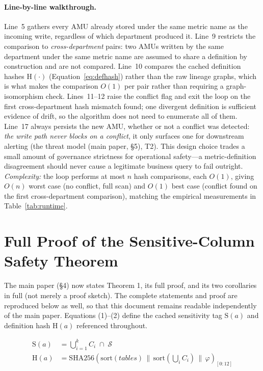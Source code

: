\documentclass[9pt,twocolumn,twoside]{extarticle}
\begin{document}
\paragraph{Line-by-line walkthrough.}
Line~5 gathers every AMU already stored under the same metric name as the
incoming write, regardless of which department produced it.
Line~9 restricts the comparison to \emph{cross-department} pairs: two AMUs
written by the same department under the same metric name are assumed to
share a definition by construction and are not compared.
Line~10 compares the cached definition hashes $\mathrm{H}(\cdot)$
(Equation~\ref{eq:defhash}) rather than the raw lineage graphs, which is what
makes the comparison $O(1)$ per pair rather than requiring a graph-isomorphism
check.
Lines~11--12 raise the conflict flag and exit the loop on the first
cross-department hash mismatch found; one divergent definition is sufficient
evidence of drift, so the algorithm does not need to enumerate all of them.
Line~17 always persists the new AMU, whether or not a conflict was detected:
\emph{the write path never blocks on a conflict}, it only surfaces one for
downstream alerting (the threat model (main paper, \S5), T2).
This design choice trades a small amount of governance strictness for
operational safety---a metric-definition disagreement should never cause a
legitimate business query to fail outright.
\emph{Complexity:} the loop performs at most $n$ hash comparisons, each
$O(1)$, giving $O(n)$ worst case (no conflict, full scan) and $O(1)$ best case
(conflict found on the first cross-department comparison), matching the
empirical measurements in Table~\ref{tab:runtime}.

\section{Full Proof of the Sensitive-Column Safety Theorem}
\label{sec:supp-proof}
The main paper (\S4) now states Theorem 1, its full proof, and its two
corollaries in full (not merely a proof sketch). The complete statements and
proof are reproduced below as well, so that this document remains readable
independently of the main paper.
Equations (1)--(2) define the cached sensitivity tag $\mathrm{S}(a)$ and
definition hash $\mathrm{H}(a)$ referenced throughout.

\begin{align}
  \mathrm{S}(a) &= \bigcup_{i=1}^{k} C_i \;\cap\; \mathcal{S}
  \label{eq:sensitivity} \\[2pt]
  \mathrm{H}(a) &= \mathrm{SHA256}\!\left(
    \mathrm{sort}(\mathit{tables}) \,\|\,
    \mathrm{sort}\!\left(\bigcup_i C_i\right) \,\|\, \varphi
  \right)_{\![0{:}12]}
  \label{eq:defhash}
\end{align}
\end{document}
